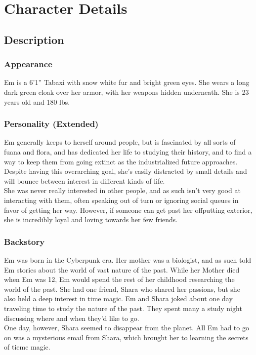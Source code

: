 \documentclass[a4paper,openany,twocolumn]{book}
\begin{document}
\onecolumn






\restoregeometry
\twocolumn
\chapter*{Character Details}
\section*{Description}
\subsection*{Appearance}
Em is a 6'1'' Tabaxi with snow white fur and bright green eyes. She wears
a long dark green cloak over her armor, with her weapons hidden underneath. She
is 23 years old and 180 lbs.
\subsection*{Personality (Extended)}
Em generally keeps to herself around people, but is fascinated by all sorts of
fuana and flora, and has dedicated her life to studying their history, and to
find a way to keep them from going extinct as the industrialized future
approaches. Despite having this overarching goal, she's easily distracted by
small details and will bounce between interest in different kinds of life. \\
She was never really interested in other people, and as such isn't very good at
interacting with them, often speaking out of turn or ignoring social queues in
favor of getting her way. However, if someone can get past her offputting
exterior, she is incredibly loyal and loving towards her few friends.
\vfill\null
\columnbreak
\subsection*{Backstory}
Em was born in the Cyberpunk era. Her mother was a biologist, and as such told
Em stories about the world of vast nature of the past. While her Mother died
when Em was 12, Em would spend the rest of her childhood researching the world
of the past. She had one friend, Shara who shared her passions, but she also
held a deep interest in time magic. Em and Shara joked about one day traveling
time to study the nature of the past. They spent many a study night discussing
where and when they'd like to go. \\ One day, however, Shara seemed to disappear
from the planet. All Em had to go on was a mysterious email from Shara, which
brought her to learning the secrets of tieme magic.
\end{document}
